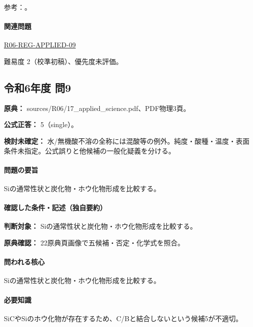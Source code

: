 \par 参考：\cite{inorganic_metalloid_ref,inorganic_sic,inorganic_sib6,inorganic_hf_etch}。

\paragraph{関連問題} \hyperref[q:r06-reg-applied-09]{R06-REG-APPLIED-09}

\par 難易度 2（校準初稿）、優先度未評価。

\subsection{令和6年度 問9}
\label{q:r06-reg-applied-09}

\noindent\textbf{原典：} sources/R06/17\_applied\_science.pdf、PDF物理3頁。

\textbf{公式正答：} 5（single）。

\par\textbf{検討未確定：} 水/無機酸不溶の全称には混酸等の例外。純度・酸種・温度・表面条件未指定。公式誤りと他候補の一般化疑義を分ける。

\paragraph{問題の要旨} Siの通常性状と炭化物・ホウ化物形成を比較する。

\paragraph{確認した条件・記述（独自要約）}\mbox{}\par

\noindent\textbf{判断対象：} Siの通常性状と炭化物・ホウ化物形成を比較する。\par

\noindent\textbf{原典確認：} 22原典頁画像で五候補・否定・化学式を照合。\par

\paragraph{問われる核心} Siの通常性状と炭化物・ホウ化物形成を比較する。

\paragraph{必要知識} SiCやSiのホウ化物が存在するため、C/Bと結合しないという候補5が不適切。

